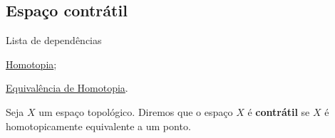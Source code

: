 \subsection{Espaço contrátil}
\label{espaco-contratil-def}
\begin{titlemize}{Lista de dependências}
	\item \hyperref[homotopia-def]{Homotopia};\\
        \item \hyperref[equiv-homotopia]{Equivalência de Homotopia}.
\end{titlemize}

\begin{defi}
	Seja $X$ um espaço topológico. Diremos que o espaço $X$ é \textbf{contrátil} se $X$ é homotopicamente equivalente a um ponto.
\end{defi}
